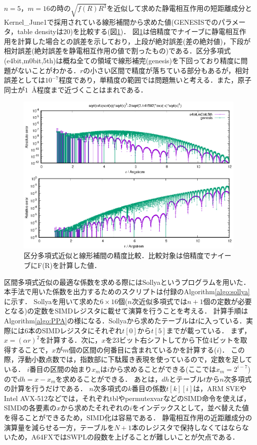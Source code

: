 \documentclass[uplatex,11pt,a4j,titlepage,oneside,openright,dvipdfmx]{jsbook}
\begin{document}
$n=5$，$m=16$の時の$\sqrt{f(R)R^3}$を近似して求めた静電相互作用の短距離成分とKernel\_June1で採用されている線形補間から求めた値(GENESISでのパラメータ，table densityは20)を比較する(図\ref{fig:key4_0_5th})．
図\ref{fig:key4_0_5th}は倍精度でナイーブに静電相互作用を計算した場合との誤差を示しており，上段が絶対誤差(差の絶対値)，下段が相対誤差(絶対誤差を静電相互作用の値で割ったもの)である．区分多項式(e4bit,m0bit,5th)は概ね全ての領域で線形補完(genesis)を下回っており精度に問題がないことがわかる．$r$の小さい区間で精度が落ちている部分もあるが，相対誤差としては$10^{-7}$程度であり，単精度の範囲では問題無いと考える．また，原子同士が\mbox{$1$ \AA}程度まで近づくことはまれである．
\begin{figure}
 \centering
 \includegraphics[width=12.0cm]{figure/key4_0_5th.eps}
 \caption[]{区分多項式近似と線形補間の精度比較．比較対象は倍精度でナイーブにF(R)を計算した値．}
 \label{fig:key4_0_5th}
\end{figure}

区間多項式近似の最適な係数を求める際にはSollya\cite{Sollya}というプログラムを用いた．
本手法で用いた係数を出力するためのスクリプトは付録のAlgorithm\ref{algo:sollya}に示す．
Sollyaを用いて求めた$6\times16$個($n$次近似多項式では$n+1$個の定数が必要となる)の定数をSIMDレジスタに載せて演算を行うことを考える．
計算手順はAlgorithm\ref{algo:PPA}の様になる．Sollyaから求めたテーブルは$t$に入っている．実際には6本のSIMDレジスタにそれぞれ$t[0]$から$t[5]$までが載っている．
まず，$x=(\alpha r)^2$を計算する．次に，$x$を23ビット右シフトしてから下位4ビットを取得することで，$x$が$m$個の区間の何番目に含まれているかを計算する($i$)．
この際，浮動小数点数では，指数部に下駄履き表現を使っているので，定数を足している．
$i$番目の区間の始まり$x_m$は$i$から求めることができる(ここでは$x_m = 2^{i-7}$)ので$dh = x - x_m$を求めることができる．
あとは，$dh$とテーブル$t$から$n$次多項式の計算を行うだけである．
$n$次多項式の$k$番目の係数$t[k][i]$は，ARM SVEやIntel AVX-512などでは，それぞれtblやpermutexvarなどのSIMD命令を使えば，
SIMDの各要素の$x$から求めたそれぞれの$i$をインデックスとして，並べ替えた値を得ることができるため，SIMD化は容易である．
静電相互作用の近距離成分の演算量を減らせる一方，テーブルを$N+1$本のレジスタで保持しなくてはならないため，A64FXではSWPLの段数を上げることが難しいことが欠点である．
\end{document}
